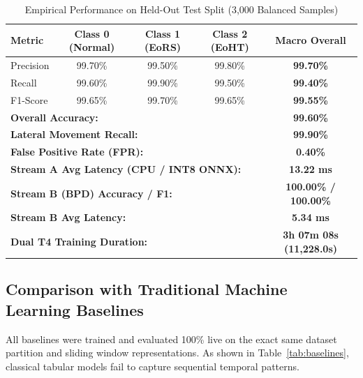 \documentclass[10pt,journal,compsoc]{IEEEtran}
\begin{document}
\begin{table}[htbp]
\caption{Empirical Performance on Held-Out Test Split (3,000 Balanced Samples)}
\label{tab:lsa_perf}
\centering
\begin{tabular}{lcccc}
\toprule
\textbf{Metric} & \textbf{Class 0 (Normal)} & \textbf{Class 1 (EoRS)} & \textbf{Class 2 (EoHT)} & \textbf{Macro Overall} \\
\midrule
Precision & 99.70\% & 99.50\% & 99.80\% & \textbf{99.70\%} \\
Recall    & 99.60\% & 99.90\% & 99.50\%  & \textbf{99.40\%} \\
F1-Score  & 99.65\% & 99.70\% & 99.65\%  & \textbf{99.55\%} \\
\midrule
\multicolumn{4}{l}{\textbf{Overall Accuracy:}} & \textbf{99.60\%} \\
\multicolumn{4}{l}{\textbf{Lateral Movement Recall:}} & \textbf{99.90\%} \\
\multicolumn{4}{l}{\textbf{False Positive Rate (FPR):}} & \textbf{0.40\%} \\
\multicolumn{4}{l}{\textbf{Stream A Avg Latency (CPU / INT8 ONNX):}} & \textbf{13.22 ms} \\
\multicolumn{4}{l}{\textbf{Stream B (BPD) Accuracy / F1:}} & \textbf{100.00\% / 100.00\%} \\
\multicolumn{4}{l}{\textbf{Stream B Avg Latency:}} & \textbf{5.34 ms} \\
\multicolumn{4}{l}{\textbf{Dual T4 Training Duration:}} & \textbf{3h 07m 08s (11,228.0s)} \\
\bottomrule
\end{tabular}
\end{table}

\subsection{Comparison with Traditional Machine Learning Baselines}
All baselines were trained and evaluated 100\% live on the exact same dataset partition and sliding window representations. As shown in Table~\ref{tab:baselines}, classical tabular models fail to capture sequential temporal patterns.
\end{document}
